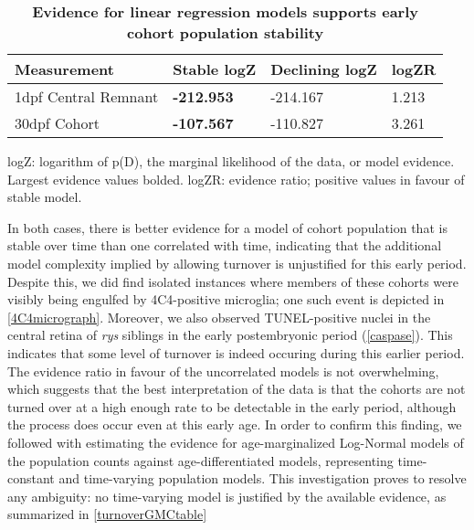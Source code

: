 \begin{table}[!ht]
    \centering
    \caption{{\bf Evidence for linear regression models supports early cohort population stability}}
    \begin{tabular}{|l|l|l|l|}
    \hline
    {\bf Measurement} & {\bf Stable logZ} & {\bf Declining logZ} & {\bf logZR}\\ \hline
    1dpf Central Remnant & {\bf -212.953} & -214.167 & 1.213\\ \hline    
    30dpf Cohort & {\bf -107.567} & -110.827 & 3.261\\ \hline
    \end{tabular}
   
    \begin{flushleft}logZ: logarithm of p(D), the marginal likelihood of the data, or model evidence.  Largest evidence values bolded. logZR: evidence ratio; positive values in favour of stable model.
    \end{flushleft}
    \label{turnovertable}
\end{table}

In both cases, there is better evidence for a model of cohort population that is stable over time than one correlated with time, indicating that the additional model complexity implied by allowing turnover is unjustified for this early period. Despite this, we did find isolated instances where members of these cohorts were visibly being engulfed by 4C4-positive microglia; one such event is depicted in \autoref{4C4micrograph}. Moreover, we also observed TUNEL-positive nuclei in the central retina of \textit{rys} siblings in the early postembryonic period (\autoref{caspase}). This indicates that some level of turnover is indeed occuring during this earlier period. The evidence ratio in favour of the uncorrelated models is not overwhelming, which suggests that the best interpretation of the data is that the cohorts are not turned over at a high enough rate to be detectable in the early period, although the process does occur even at this early age. In order to confirm this finding, we followed with estimating the evidence for age-marginalized Log-Normal models of the population counts against age-differentiated models, representing time-constant and time-varying population models. This investigation proves to resolve any ambiguity: no time-varying model is justified by the available evidence, as summarized in \autoref{turnoverGMCtable}

